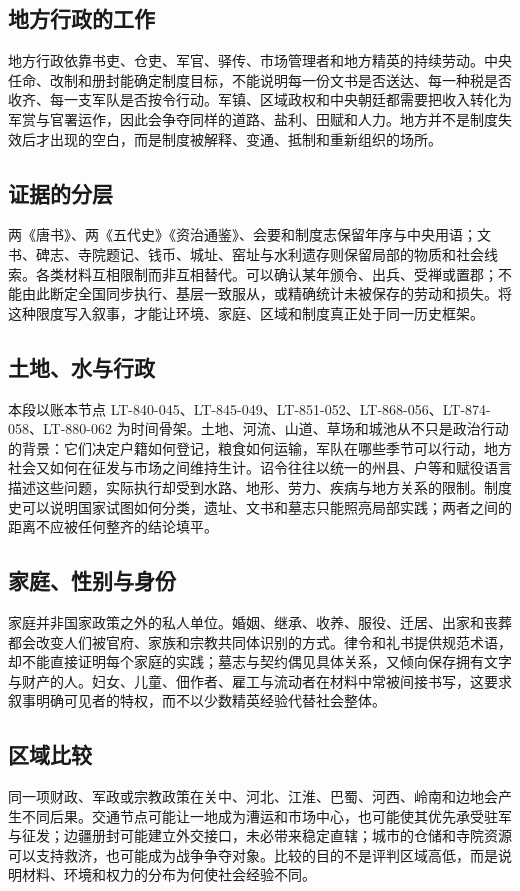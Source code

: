 \subsection{地方行政的工作}
地方行政依靠书吏、仓吏、军官、驿传、市场管理者和地方精英的持续劳动。中央任命、改制和册封能确定制度目标，不能说明每一份文书是否送达、每一种税是否收齐、每一支军队是否按令行动。军镇、区域政权和中央朝廷都需要把收入转化为军赏与官署运作，因此会争夺同样的道路、盐利、田赋和人力。地方并不是制度失效后才出现的空白，而是制度被解释、变通、抵制和重新组织的场所。

\subsection{证据的分层}
两《唐书》、两《五代史》《资治通鉴》、会要和制度志保留年序与中央用语；文书、碑志、寺院题记、钱币、城址、窑址与水利遗存则保留局部的物质和社会线索。各类材料互相限制而非互相替代。可以确认某年颁令、出兵、受禅或置郡；不能由此断定全国同步执行、基层一致服从，或精确统计未被保存的劳动和损失。将这种限度写入叙事，才能让环境、家庭、区域和制度真正处于同一历史框架。
\subsection{土地、水与行政}
本段以账本节点 LT-840-045、LT-845-049、LT-851-052、LT-868-056、LT-874-058、LT-880-062 为时间骨架。土地、河流、山道、草场和城池从不只是政治行动的背景：它们决定户籍如何登记，粮食如何运输，军队在哪些季节可以行动，地方社会又如何在征发与市场之间维持生计。诏令往往以统一的州县、户等和赋役语言描述这些问题，实际执行却受到水路、地形、劳力、疾病与地方关系的限制。制度史可以说明国家试图如何分类，遗址、文书和墓志只能照亮局部实践；两者之间的距离不应被任何整齐的结论填平。

\subsection{家庭、性别与身份}
家庭并非国家政策之外的私人单位。婚姻、继承、收养、服役、迁居、出家和丧葬都会改变人们被官府、家族和宗教共同体识别的方式。律令和礼书提供规范术语，却不能直接证明每个家庭的实践；墓志与契约偶见具体关系，又倾向保存拥有文字与财产的人。妇女、儿童、佃作者、雇工与流动者在材料中常被间接书写，这要求叙事明确可见者的特权，而不以少数精英经验代替社会整体。

\subsection{区域比较}
同一项财政、军政或宗教政策在关中、河北、江淮、巴蜀、河西、岭南和边地会产生不同后果。交通节点可能让一地成为漕运和市场中心，也可能使其优先承受驻军与征发；边疆册封可能建立外交接口，未必带来稳定直辖；城市的仓储和寺院资源可以支持救济，也可能成为战争争夺对象。比较的目的不是评判区域高低，而是说明材料、环境和权力的分布为何使社会经验不同。

